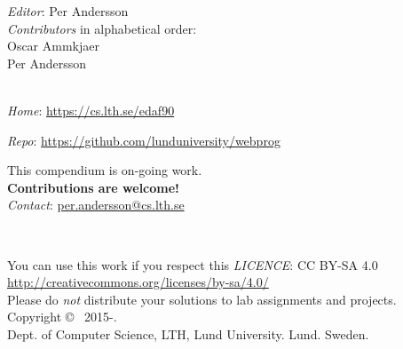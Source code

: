 
\clearpage\null\thispagestyle{empty}
\vfill

{
\setlength{\parindent}{0pt}
\emph{Editor}: Per Andersson \\

%
\emph{Contributors} in alphabetical order: \\
Oscar Ammkjaer\\
Per Andersson \\
\\ \newline

\emph{Home}: \url{https://cs.lth.se/edaf90} \newline

\emph{Repo}: \url{https://github.com/lunduniversity/webprog} \\ \newline

This compendium is on-going work. \\ \textbf{Contributions are welcome!} \\
\emph{Contact}: \url{per.andersson@cs.lth.se}
\\ \newline

~\\ \newline

You can use this work if you respect this \emph{LICENCE}: CC BY-SA 4.0 \\
\url{http://creativecommons.org/licenses/by-sa/4.0/} \\
Please do \emph{not} distribute your solutions to lab assignments and projects.
\\ \newline
Copyright \copyright~ 2015-\the\year. \\
Dept. of Computer Science, LTH, Lund University. Lund. Sweden.\\
}
